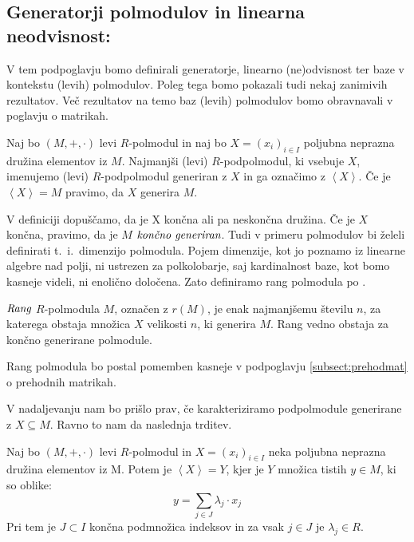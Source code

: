 \documentclass[mat1]{fmfdelo}
\newcommand{\pojem}[1]{\ensuremath{\emph{#1}}}
\newcommand{\Gen}[1]{\ensuremath{\left<{#1}\right>}}
\begin{document}
\subsection{Generatorji polmodulov in linearna neodvisnost:}
V tem podpoglavju bomo definirali generatorje, linearno (ne)odvisnost ter baze v kontekstu (levih) polmodulov. Poleg tega bomo pokazali tudi nekaj zanimivih rezultatov. Več rezultatov na temo baz (levih) polmodulov bomo obravnavali v poglavju o matrikah.
\begin{definicija}
	Naj bo $(M, +, \cdot)$ levi $R$-polmodul in naj bo $X = (x_i)_{i\in I}$ poljubna neprazna družina elementov iz $M$. Najmanjši (levi) $R$-podpolmodul, ki vsebuje $X$, imenujemo (levi) $R$-podpolmodul generiran z $X$ in ga označimo z \Gen{X}. Če je $\Gen{X} = M$ pravimo, da $X$ generira $M$.
\end{definicija}

	V definiciji dopuščamo, da je X končna ali pa neskončna družina. Če je $X$ končna, pravimo, da je $M$ \pojem{končno generiran}. Tudi v primeru polmodulov bi želeli definirati t.~i.\ dimenzijo polmodula. Pojem dimenzije, kot jo poznamo iz linearne algebre nad polji, ni ustrezen za polkolobarje, saj kardinalnost baze, kot bomo kasneje videli, ni enolično določena. Zato definiramo rang polmodula po \cite[str. 3--4]{bib:Tanbase}.

\begin{definicija}
	\pojem{Rang} $R$-polmodula $M$, označen z $r(M)$, je enak najmanjšemu številu $n$, za katerega obstaja množica $X$ velikosti $n$, ki generira $M$. Rang vedno obstaja za končno generirane polmodule. 
\end{definicija}

Rang polmodula bo postal pomemben kasneje v podpoglavju \ref{subsect:prehodmat} o prehodnih matrikah.

V nadaljevanju nam bo prišlo prav, če karakteriziramo podpolmodule generirane z $X\subseteq M$. Ravno to nam da naslednja trditev.

\begin{trditev}
	Naj bo $(M, +, \cdot)$ levi $R$-polmodul in $X = (x_i)_{i\in I}$ neka poljubna neprazna družina elementov iz M. Potem je $\Gen{X} = Y$, kjer je $Y$  množica tistih $y\in M$, ki so oblike: $$ y = \sum_{j\in J} \lambda_j \cdot x_j$$ Pri tem je $J\subset I$ končna podmnožica indeksov in za vsak $j\in J$ je $\lambda_j \in R$.
\end{trditev}
\end{document}
